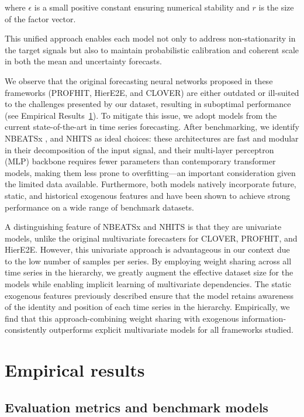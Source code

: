 \documentclass[letterpaper]{article}
\begin{document}
where $\epsilon$ is a small positive constant ensuring numerical stability and $r$ is the size of the factor vector.

This unified approach enables each model not only to address non-stationarity in the target signals but also to maintain probabilistic calibration and coherent scale in both the mean and uncertainty forecasts.

We observe that the original forecasting neural networks proposed in these frameworks (PROFHIT, HierE2E, and CLOVER) are either outdated or ill-suited to the challenges presented by our dataset, resulting in suboptimal performance (see Empirical Results~\ref{sec:empirical_results}). To mitigate this issue, we adopt models from the current state-of-the-art in time series forecasting. After benchmarking, we identify NBEATSx \cite{NBEATS}, \cite{NBEATSx} and NHITS \cite{NHITS} as ideal choices: these architectures are fast and modular in their decomposition of the input signal, and their multi-layer perceptron (MLP) backbone requires fewer parameters than contemporary transformer models, making them less prone to overfitting---an important consideration given the limited data available. Furthermore, both models natively incorporate future, static, and historical exogenous features and have been shown to achieve strong performance on a wide range of benchmark datasets.

A distinguishing feature of NBEATSx and NHITS is that they are univariate models, unlike the original multivariate forecasters for CLOVER, PROFHIT, and HierE2E. However, this univariate approach is advantageous in our context due to the low number of samples per series. By employing weight sharing across all time series in the hierarchy, we greatly augment the effective dataset size for the models while enabling implicit learning of multivariate dependencies. The static exogenous features previously described ensure that the model retains awareness of the identity and position of each time series in the hierarchy. Empirically, we find that this approach-combining weight sharing with exogenous information-consistently outperforms explicit multivariate models for all frameworks studied.

\section{Empirical results}
\label{sec:empirical_results}

\subsection{Evaluation metrics and benchmark models}
\end{document}
